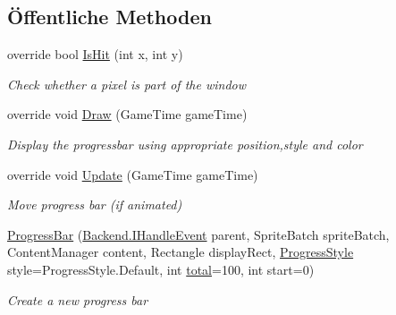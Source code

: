 \subsection*{Öffentliche Methoden}
\begin{DoxyCompactItemize}
\item 
override bool \hyperlink{class_gruppe22_1_1_client_1_1_progress_bar_a71b7f2b9c567a74a3a27ed2efec9b346}{Is\-Hit} (int x, int y)
\begin{DoxyCompactList}\small\item\em Check whether a pixel is part of the window \end{DoxyCompactList}\item 
override void \hyperlink{class_gruppe22_1_1_client_1_1_progress_bar_ad0729c9280a779e37797f5342d374993}{Draw} (Game\-Time game\-Time)
\begin{DoxyCompactList}\small\item\em Display the progressbar using appropriate position,style and color \end{DoxyCompactList}\item 
override void \hyperlink{class_gruppe22_1_1_client_1_1_progress_bar_ac1f470e3a5fa29d2b408e3617e0a5f19}{Update} (Game\-Time game\-Time)
\begin{DoxyCompactList}\small\item\em Move progress bar (if animated) \end{DoxyCompactList}\item 
\hyperlink{class_gruppe22_1_1_client_1_1_progress_bar_a9f09493570ef928d80d1d62d20dcccf4}{Progress\-Bar} (\hyperlink{interface_gruppe22_1_1_backend_1_1_i_handle_event}{Backend.\-I\-Handle\-Event} parent, Sprite\-Batch sprite\-Batch, Content\-Manager content, Rectangle display\-Rect, \hyperlink{namespace_gruppe22_1_1_client_a4f652636831acdc7988060a3c213d941}{Progress\-Style} style=Progress\-Style.\-Default, int \hyperlink{class_gruppe22_1_1_client_1_1_progress_bar_ae3302bc227446998679b7e4a0f67f9bb}{total}=100, int start=0)
\begin{DoxyCompactList}\small\item\em Create a new progress bar \end{DoxyCompactList}\end{DoxyCompactItemize}
